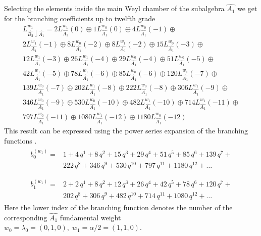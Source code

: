 \documentclass[a4paper,12pt]{article}
\theoremstyle{definition} \newtheorem{Def}{Definition}
\begin{document}
Selecting the elements inside the main Weyl chamber of the subalgebra $\hat{A_1}$ we get for the branching coefficients up to twelfth grade
\begin{multline}
  \label{eq:28}
  L^{w_1}_{\hat{B_2}\downarrow \hat{A_1}}=2 L_{\hat{A_1}}^{w_1}(0)\oplus 1 L_{\hat{A_1}}^{w_0}(0)\oplus 4 L_{\hat{A_1}}^{w_0}(-1)\oplus\\
    2 L_{\hat{A_1}}^{w_1}(-1)\oplus 8 L_{\hat{A_1}}^{w_0}(-2)\oplus
    8 L_{\hat{A_1}}^{w_1}(-2)\oplus 15 L_{\hat{A_1}}^{w_0}(-3)\oplus\\
    12 L_{\hat{A_1}}^{w_1}(-3)\oplus 26 L_{\hat{A_1}}^{w_1}(-4)\oplus
    29 L_{\hat{A_1}}^{w_0}(-4)\oplus 51 L_{\hat{A_1}}^{w_0}(-5)\oplus\\
    42 L_{\hat{A_1}}^{w_1}(-5)\oplus 78 L_{\hat{A_1}}^{w_1}(-6)\oplus
    85 L_{\hat{A_1}}^{w_0}(-6)\oplus 120 L_{\hat{A_1}}^{w_1}(-7)\oplus\\
    139 L_{\hat{A_1}}^{w_0}(-7)\oplus 202 L_{\hat{A_1}}^{w_1}(-8)\oplus
    222 L_{\hat{A_1}}^{w_0}(-8)\oplus 306 L_{\hat{A_1}}^{w_1}(-9)\oplus\\
    346 L_{\hat{A_1}}^{w_0}(-9)\oplus 530 L_{\hat{A_1}}^{w_0}(-10)\oplus
    482 L_{\hat{A_1}}^{w_1}(-10)\oplus 714 L_{\hat{A_1}}^{w_1}(-11)\oplus\\
    797 L_{\hat{A_1}}^{w_0}(-11)\oplus 1080 L_{\hat{A_1}}^{w_1}(-12)\oplus
    1180 L_{\hat{A_1}}^{w_0}(-12)
\end{multline}
This result can be expressed using the power series expansion of the branching functions \cite{kac1990idl}.
\begin{eqnarray}
  \label{eq:29}
  \begin{array}{cc}
    b^{(w_1)}_{0}= & 1 + 4\,q^{1}+ 8\,q^{2}+ 15\,q^{3}+ 29\,q^{4}+ 51\,q^{5}+ 85\,q^{6}+ 139\,q^{7}+\\
     &222\,q^{8}+ 346\,q^{9}+ 530\,q^{10}+ 797\,q^{11}+ 1180\,q^{12}+\dots\\
  \end{array}\\
  \begin{array}{cc}
    b^{(w_1)}_{1}= &2+2\,q^{1}+8\,q^{2}+12\,q^{3}+26\,q^{4}+42\,q^{5}+78\,q^{6}+120\,q^{7}+\\
    & 202\,q^{8}+306\,q^{9}+482\,q^{10}+714\,q^{11}+1080\,q^{12}+\dots
  \end{array}
\end{eqnarray}
Here the lower index of the branching function denotes the number of the corresponding $\hat{A_1}$ fundamental weight $w_0=\lambda_0=(0,1,0),\; w_1=\alpha/2=(1,1,0)$.
\end{document}
